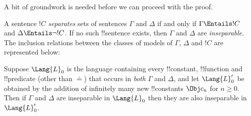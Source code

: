 \documentclass[../../include/open-logic-section]{subfiles}
\begin{document}


A bit of groundwork is needed before we can proceed with the proof.

\begin{defn}
A sentence $!C$ \emph{separates} sets of sentences $\Gamma$ and
$\Delta$ if and only if $\Gamma \Entails !C$ and $\Delta \Entails
\lnot !C$. If no such !!{sentence} exists, then $\Gamma$ and $\Delta$ are
\emph{inseparable}. The inclusion relations between the classes of
models of $\Gamma$, $\Delta$ and $!C$ are represented below:
\begin{figure}[h]
  \centering
\end{figure}
\end{defn}

\begin{lem}
Suppose $\Lang{L}_0$ is the language containing every !!{constant},
!!{function} and !!{predicate} (other than $\doteq$) that occurs in
\emph{both} $\Gamma$ and $\Delta$, and let $\Lang{L}'_0$ be obtained
by the addition of infinitely many new !!{constant}s $\Obj c_n$ for $n
\ge 0$. Then if $\Gamma$ and $\Delta$ are inseparable in $\Lang{L}_0$
then they are also inseparable in $\Lang{L}'_0$.
\end{lem}
\end{document}
